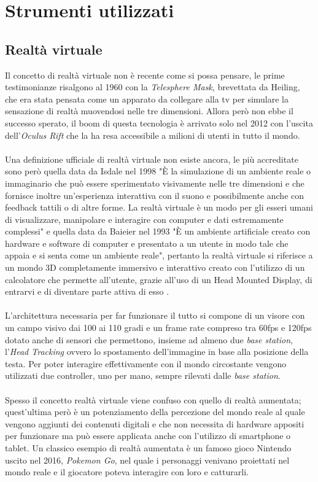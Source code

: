 \chapter{Strumenti utilizzati}\label{ch:capitolo2}
\section{Realtà virtuale}
Il concetto di realtà virtuale non è recente come si possa pensare, le prime testimonianze risalgono al 1960 con la \textit{Telesphere Mask}, brevettata da Heiling, che era stata pensata come un apparato da collegare alla tv per simulare la sensazione di realtà muovendosi nelle tre dimensioni. Allora però non ebbe il successo sperato, il boom di questa tecnologia è arrivato solo nel 2012 con l'uscita dell'\textit{Oculus Rift} che la ha resa accessibile a milioni di utenti in tutto il mondo.\\\\
Una definizione ufficiale di realtà virtuale non esiste ancora, le più accreditate sono però quella data da Isdale nel 1998 "È la simulazione di un ambiente reale o immaginario che può essere sperimentato visivamente nelle tre dimensioni e che fornisce inoltre un'esperienza interattiva con il suono e possibilmente anche con feedback tattili o di altre forme. La realtà virtuale è un modo per gli esseri umani di visualizzare, manipolare e interagire con computer e dati estremamente complessi" e quella data da Baieier nel 1993 "È un ambiente artificiale creato con hardware e software di computer e presentato a un utente in modo tale che appaia e si senta come un ambiente reale", pertanto la realtà virtuale si riferisce a un mondo 3D completamente immersivo e interattivo creato con l'utilizzo di un calcolatore che permette all'utente, grazie all'uso di un Head Mounted Display, di entrarvi e di diventare parte attiva di esso \cite{inbook}.\\\\
L'architettura necessaria per far funzionare il tutto si compone di un visore con un campo visivo dai 100 ai 110 gradi e un frame rate compreso tra 60fps e 120fps dotato anche di sensori che permettono, insieme ad almeno due \textit{base station}, l'\textit{Head Tracking} ovvero lo spostamento dell'immagine in base alla posizione della testa. Per poter interagire effettivamente con il mondo circostante vengono utilizzati due controller, uno per mano, sempre rilevati dalle \textit{base station}.\\\\
Spesso il concetto realtà virtuale viene confuso con quello di realtà aumentata; quest'ultima però è un potenziamento della percezione del mondo reale al quale vengono aggiunti dei contenuti digitali e che non necessita di hardware appositi per funzionare ma può essere applicata anche con l'utilizzo di smartphone o tablet. Un classico esempio di realtà aumentata è un famoso gioco Nintendo uscito nel 2016, \textit{Pokemon Go}, nel quale i personaggi venivano proiettati nel mondo reale e il giocatore poteva interagire con loro e catturarli. \\\\
